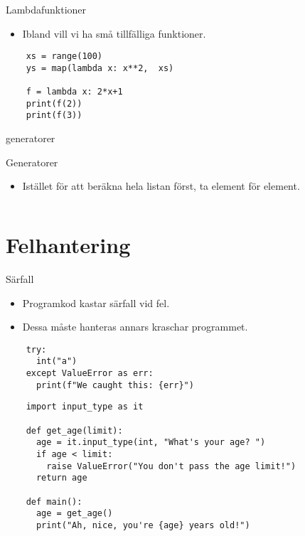 \begin{frame}[fragile]
  \begin{block}{Lambdafunktioner}
    \begin{itemize}
      \item Ibland vill vi ha små tillfälliga funktioner.
    \end{itemize}
  \end{block}

  \begin{verbatim}
    xs = range(100)
    ys = map(lambda x: x**2,  xs)

    f = lambda x: 2*x+1
    print(f(2))
    print(f(3))
  \end{verbatim}
\end{frame}

generatorer
\begin{frame}[fragile]
  \begin{block}{Generatorer}
    \begin{itemize}
      \item Istället för att beräkna hela listan först, ta element för element.
    \end{itemize}
  \end{block}

  \inputminted[firstline=3,lastline=15]{python}{examples/generators.py}
\end{frame}


\section{Felhantering}

\begin{frame}[fragile]
  \begin{block}{Särfall}
    \begin{itemize}
      \item Programkod kastar särfall vid fel.
      \item Dessa måste hanteras annars kraschar programmet.
    \end{itemize}
  \end{block}

  \begin{verbatim}
    try:
      int("a")
    except ValueError as err:
      print(f"We caught this: {err}")
  \end{verbatim}
\end{frame}

\begin{frame}[fragile]
  \begin{verbatim}
    import input_type as it

    def get_age(limit):
      age = it.input_type(int, "What's your age? ")
      if age < limit:
        raise ValueError("You don't pass the age limit!")
      return age

    def main():
      age = get_age()
      print("Ah, nice, you're {age} years old!")
  \end{verbatim}
\end{frame}

